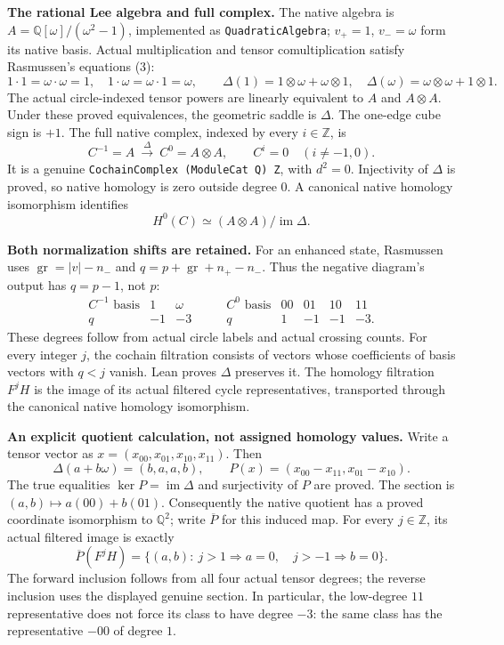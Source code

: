 \documentclass[11pt]{article}
\newcommand{\Q}{\mathbb Q}
\newcommand{\Z}{\mathbb Z}
\newcommand{\im}{\operatorname{im}}
\newcommand{\gr}{\operatorname{gr}}
\begin{document}
\newpage
\textbf{The rational Lee algebra and full complex.}
The native algebra is $A=\Q[\omega]/(\omega^2-1)$, implemented as
\texttt{QuadraticAlgebra}; $v_+=1$, $v_-=\omega$ form its native basis.
Actual multiplication and tensor comultiplication satisfy Rasmussen's
equations (3):
\[
 1\cdot1=\omega\cdot\omega=1,\quad
 1\cdot\omega=\omega\cdot1=\omega,\qquad
 \Delta(1)=1\otimes\omega+\omega\otimes1,\quad
 \Delta(\omega)=\omega\otimes\omega+1\otimes1.
\]
The actual circle-indexed tensor powers are linearly equivalent to $A$
and $A\otimes A$. Under these proved equivalences, the geometric saddle
is $\Delta$. The one-edge cube sign is $+1$. The full native complex,
indexed by every $i\in\Z$, is
\[
 C^{-1}=A\ \xrightarrow{\ \Delta\ }\ C^0=A\otimes A,
 \qquad C^i=0\quad(i\ne-1,0).
\]
It is a genuine \texttt{CochainComplex (ModuleCat Q) Z}, with $d^2=0$.
Injectivity of $\Delta$ is proved, so native homology is zero outside
degree 0. A canonical native homology isomorphism identifies
\[
 H^0(C)\simeq (A\otimes A)/\im\Delta.
\]

\textbf{Both normalization shifts are retained.}
For an enhanced state, Rasmussen uses
$\gr=|v|-n_-$ and $q=p+\gr+n_+-n_-$.
Thus the negative diagram's output has $q=p-1$, not $p$:
\[
\begin{array}{c|rr}
 C^{-1}\text{ basis}&1&\omega\\\hline
 q&-1&-3
\end{array}
\qquad
\begin{array}{c|rrrr}
 C^0\text{ basis}&00&01&10&11\\\hline
 q&1&-1&-1&-3 .
\end{array}
\]
These degrees follow from actual circle labels and actual crossing counts.
For every integer $j$, the cochain filtration consists of vectors whose
coefficients of basis vectors with $q<j$ vanish. Lean proves $\Delta$
preserves it. The homology filtration $F^jH$ is the image of its actual
filtered cycle representatives, transported through the canonical native
homology isomorphism.

\textbf{An explicit quotient calculation, not assigned homology values.}
Write a tensor vector as $x=(x_{00},x_{01},x_{10},x_{11})$.
Then
\[
 \Delta(a+b\omega)=(b,a,a,b),\qquad
 P(x)=(x_{00}-x_{11},x_{01}-x_{10}).
\]
The true equalities $\ker P=\im\Delta$ and surjectivity of $P$ are proved.
The section is $(a,b)\mapsto a(00)+b(01)$.
Consequently the native quotient has a proved coordinate isomorphism
to $\Q^2$; write $\overline P$ for this induced map. For every
$j\in\Z$, its actual filtered image is exactly
\[
 \overline P(F^jH)=\{(a,b):\ j>1\Rightarrow a=0,\quad
                          j>-1\Rightarrow b=0\}.
\]
The forward inclusion follows from all four actual tensor degrees;
the reverse inclusion uses the displayed genuine section. In particular,
the low-degree $11$ representative does not force its class to have
degree $-3$: the same class has the representative $-00$ of degree $1$.
\end{document}
